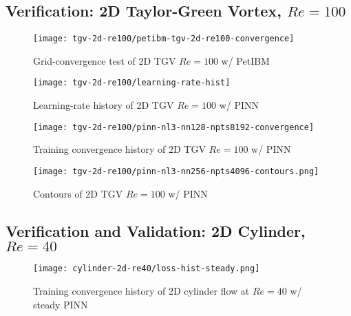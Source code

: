 
\lipsum[1]

\subsection{Verification: 2D Taylor-Green Vortex, $Re=\num{100}$}

\lipsum[1]

\begin{figure}[!hbt]
    \centering%
    \texttt{[image: tgv-2d-re100/petibm-tgv-2d-re100-convergence]}%
    \caption{%
        Grid-convergence test of 2D TGV $Re=\num{100}$ w/ PetIBM
    }
    \label{fig:tgv-petibm-convergence}%
\end{figure}

\lipsum[1]

\begin{figure}[!hbt]
    \centering%
    \texttt{[image: tgv-2d-re100/learning-rate-hist]}%
    \caption{%
        Learning-rate history of 2D TGV $Re=\num{100}$ w/ PINN
    }
    \label{fig:tgv-learning-rate-hist}%
\end{figure}

\lipsum[1]

\begin{figure}[!hbt]
    \centering%
    \texttt{[image: tgv-2d-re100/pinn-nl3-nn128-npts8192-convergence]}%
    \caption{%
        Training convergence history of 2D TGV $Re=\num{100}$ w/ PINN
    }
    \label{fig:tgv-pinn-loss}%
\end{figure}

\lipsum[1]

\begin{figure*}[!t]
    \centering%
    \texttt{[image: tgv-2d-re100/pinn-nl3-nn256-npts4096-contours.png]}%
    \caption{%
        Contours of 2D TGV $Re=\num{100}$ w/ PINN
    }
    \label{fig:tgv-pinn-contours}%
\end{figure*}

\lipsum[1]

\subsection{Verification and Validation: 2D Cylinder, $Re=\num{40}$}

\lipsum[1]

\begin{figure}[!hbt]
    \centering%
    \texttt{[image: cylinder-2d-re40/loss-hist-steady.png]}%
    \caption{%
        Training convergence history of 2D cylinder flow at $Re=\num{40}$ w/ steady PINN
    }
    \label{fig:cylinder-re40-steady-pinn-loss}%
\end{figure}

